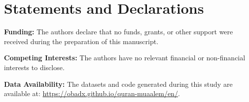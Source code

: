 \section*{Statements and Declarations}

\textbf{Funding:} The authors declare that no funds, grants, or other support were received during the preparation of this manuscript.

\textbf{Competing Interests:} The authors have no relevant financial or non-financial interests to disclose.

\textbf{Data Availability:} The datasets and code generated during this study are available at: \url{https://obadx.github.io/quran-muaalem/en/}.
